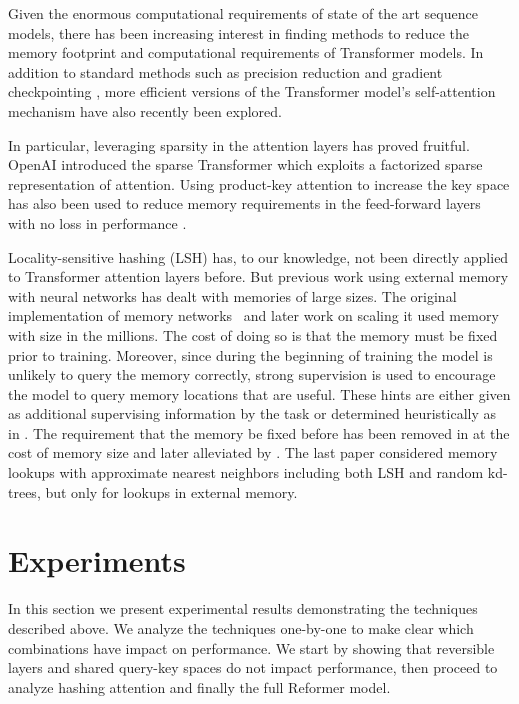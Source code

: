 Given the enormous computational requirements of state of the art sequence models, 
there has been increasing interest in finding methods to reduce the memory footprint and computational 
requirements of Transformer models.  In addition to standard methods such as precision reduction and gradient checkpointing \citep{sohoni2019lowmemory}, more efficient versions of the Transformer model's self-attention mechanism \citep{sukhbaatar2019adaptiveattn, sukhbaatar2019persistentmemory} have also recently been explored.

In particular, leveraging sparsity in the attention layers has proved fruitful. OpenAI introduced
the sparse Transformer \citep{child2019sparsetransformer} which exploits a factorized sparse 
representation of attention.  Using product-key attention to increase the key space has also been used to reduce memory requirements in the feed-forward layers with no loss in performance 
\citep{lample2019productkeys}.

Locality-sensitive hashing (LSH) has, to our knowledge, not been directly applied to 
Transformer attention layers before. But previous work using external memory with neural networks has
dealt with memories of large sizes.  The original implementation of memory networks~\citep{mem_nets} and later work on scaling it \citep{large_mem_nets, hier_mem_nets} used memory with size in the millions.  The cost of doing so is that the memory must be fixed prior to training. Moreover, since during the beginning of training the model is unlikely to query the memory correctly, strong supervision is used to encourage the model to query memory locations that are useful. These hints are either given as additional supervising information by the  task or determined heuristically as in \citet{goldilocks}.
The requirement that the memory be fixed before has been removed in
\citet{santoro16} at the cost of memory size and later alleviated by \citet{jack_rae}. The last paper considered memory lookups with approximate nearest neighbors including both LSH and random kd-trees, but only for lookups in external memory.

\section{Experiments} \label{sec:exp}

In this section we present experimental results demonstrating the techniques
described above. We analyze the techniques one-by-one to make clear which
combinations have impact on performance. We start by showing that reversible
layers and shared query-key spaces do not impact performance, then proceed 
to analyze hashing attention and finally the full Reformer model.

